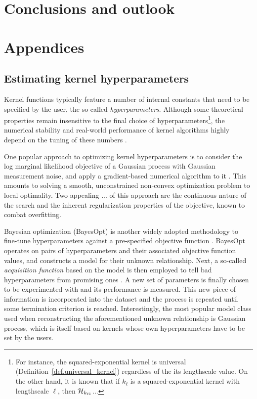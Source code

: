 
\section{Conclusions and outlook}

\section{Appendices}

\subsection{Estimating kernel hyperparameters}

Kernel functions typically feature a number of internal constants that need to be specified by the user, the so-called \textit{hyperparameters}. Although some theoretical properties remain insensitive to the final choice of hyperparameters\footnote{For instance, the squared-exponential kernel is universal (Definition~\ref{def.universal_kernel}) regardless of the its lengthscale value. On the other hand, it is known that if $k_\ell$ is a squared-exponential kernel with lengthscale $\ell$, then $\mathcal{H}_{k_{\ell1}}$... }, the numerical stability and real-world performance of kernel algorithms highly depend on the tuning of these numbers \citep{fasshauer2011positive}. 

One popular approach to optimizing kernel hyperparameters is to consider the log marginal likelihood objective of a Gaussian process with Gaussian measurement noise, and apply a gradient-based numerical algorithm to it \citep[§5.4.1]{williams2006gaussian}. This amounts to solving a smooth, unconstrained non-convex optimization problem to local optimality.  Two appealing ... of this approach are the continuous nature of the search and the inherent regularization properties of the objective, known to combat overfitting. 

Bayesian optimization (BayesOpt) is another widely adopted methodology to fine-tune hyperparameters against a pre-specified objective function \citep{snoek2012practical,shahriari2015taking}. BayesOpt operates on pairs of hyperparameters and their associated objective function values, and constructs a model for their unknown relationship. Next, a so-called \textit{acquisition function} based on the model is then employed to tell bad hyperparameters from promising ones \citep{wilson2018maximizing}. A new set of parameters is finally chosen to be experimented with and its performance is measured. This new piece of information is incorporated into the dataset and the process is repeated until some termination criterion is reached. Interestingly, the most popular model class used when reconstructing the aforementioned unknown relationship is Gaussian process, which is itself based on kernels whose own hyperparameters have to be set by the users.

